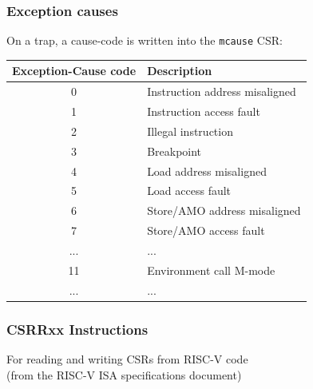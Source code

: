 
\begin{frame}
\frametitle{Exception causes}

On a trap, a cause-code is written into the {\tt mcause} CSR:

\begin{center}\small
 \begin{tabular}{|c|l|}
  \hline
  Exception-Cause code & Description \\
  \hline
  0 & Instruction address misaligned \\
  1 & Instruction access fault \\
  2 & Illegal instruction \\
  3 & Breakpoint \\
  4 & Load address misaligned \\
  5 & Load access fault \\
  6 & Store/AMO address misaligned \\
  7 & Store/AMO access fault \\
  ... & ... \\
  11 & Environment call M-mode \\
  ... & ... \\
  \hline
 \end{tabular}
\end{center}

\end{frame}


\begin{frame}
\frametitle{CSRRxx Instructions}

For reading and writing CSRs from RISC-V code \\
(from the RISC-V ISA specifications document)

\vspace{1ex}

\begin{center}
\end{center}

\end{frame}

